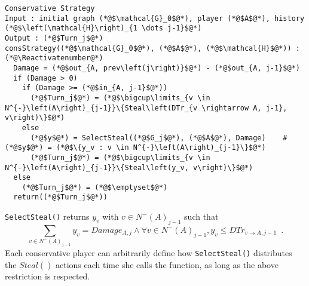 \documentclass[11pt]{llncs}
\makeatletter
\newcommand*\Suppressnumber{%
  \lst@AddToHook{OnNewLine}{%
    \let\thelstnumber\relax%
     \advance\c@lstnumber-\@ne\relax%
    }%
}
\theoremstyle{definition}
\makeatother
\begin{document}
     \Suppressnumber
     \begin{lstlisting}[label=conservativestrategy, style=numbers]
Conservative Strategy
Input : initial graph (*@$\mathcal{G}_0$@*), player (*@$A$@*), history (*@$\left(\mathcal{H}\right)_{1 \dots j-1}$@*)
Output : (*@$Turn_j$@*)
consStrategy((*@$\mathcal{G}_0$@*), (*@$A$@*), (*@$\mathcal{H}$@*)) : (*@\Reactivatenumber@*)
  Damage = (*@$out_{A, prev\left(j\right)}$@*) - (*@$out_{A, j-1}$@*)
  if (Damage > 0)
    if (Damage >= (*@$in_{A, j-1}$@*))
      (*@$Turn_j$@*) = (*@$\bigcup\limits_{v \in N^{-}\left(A\right)_{j-1}}\{Steal\left(DTr_{v \rightarrow A, j-1}, v\right)\}$@*)
    else
      (*@$y$@*) = SelectSteal((*@$G_j$@*), (*@$A$@*), Damage)    #(*@$y$@*) = (*@$\{y_v : v \in N^{-}\left(A\right)_{j-1}\}$@*)
      (*@$Turn_j$@*) = (*@$\bigcup\limits_{v \in N^{-}\left(A\right)_{j-1}}\{Steal\left(y_v, v\right)\}$@*)
  else
    (*@$Turn_j$@*) = (*@$\emptyset$@*)
  return((*@$Turn_j$@*))
     \end{lstlisting}
     \texttt{SelectSteal()} returns $y_v$ with $v \in N^{-}\left(A\right)_{j-1}$ such that
     \begin{equation*}
        \sum\limits_{v \in N^{-}\left(A\right)_{j-1}}y_v = Damage_{A, j} \wedge \forall v \in N^{-}\left(A\right)_{j-1},
        y_v \leq DTr_{v \rightarrow A, j-1} \enspace.
     \end{equation*}
     Each conservative player can arbitrarily define how \texttt{SelectSteal()} distributes the $Steal\left(\right)$ actions
     each time she calls the function, as long as the above restriction is respected. 
\end{document}
